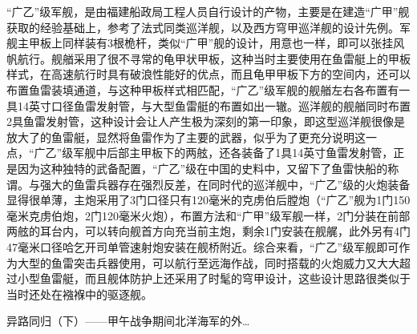 \documentclass[12pt,UTF8]{ctexbook}
\begin{document}
“广乙”级军舰，是由福建船政局工程人员自行设计的产物，主要是在建造“广甲”舰获取的经验基础上，参考了法式同类巡洋舰，以及西方穹甲巡洋舰的设计先例。军舰主甲板上同样装有3根桅杆，类似“广甲”舰的设计，用意也一样，即可以张挂风帆航行。舰艏采用了很不寻常的龟甲状甲板，这种当时主要使用在鱼雷艇上的甲板样式，在高速航行时具有破浪性能好的优点，而且龟甲甲板下方的空间内，还可以布置鱼雷装填通道，与这种甲板样式相匹配，“广乙”级军舰的舰艏左右各布置有一具14英寸口径鱼雷发射管，与大型鱼雷艇的布置如出一辙。巡洋舰的舰艏同时布置2具鱼雷发射管，这种设计会让人产生极为深刻的第一印象，即这型巡洋舰很像是放大了的鱼雷艇，显然将鱼雷作为了主要的武器，似乎为了更充分说明这一点，“广乙”级军舰中后部主甲板下的两舷，还各装备了1具14英寸鱼雷发射管，正是因为这种独特的武备配置，“广乙”级在中国的史料中，又留下了鱼雷快船的称谓。与强大的鱼雷兵器存在强烈反差，在同时代的巡洋舰中，“广乙”级的火炮装备显得很单薄，主炮采用了3门口径只有120毫米的克虏伯后膛炮（“广乙”舰为1门150毫米克虏伯炮，2门120毫米火炮），布置方法和“广甲”级军舰一样，2门分装在前部两舷的耳台内，可以转向舰首方向充当前主炮，剩余1门安装在舰艉，此外另有4门47毫米口径哈乞开司单管速射炮安装在舰桥附近。综合来看，“广乙”级军舰即可作为大型的鱼雷突击兵器使用，可以航行至远海作战，同时搭载的火炮威力又大大超过小型鱼雷艇，而且舰体防护上还采用了时髦的穹甲设计，这些设计思路很类似于当时还处在襁褓中的驱逐舰。




异路同归（下）——甲午战争期间北洋海军的外…
\end{document}
